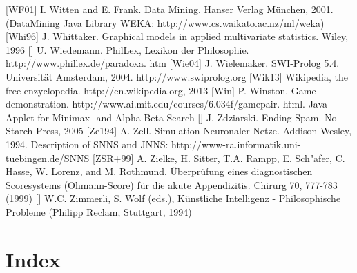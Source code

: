 \documentclass[10pt]{book}
\begin{document}
[WF01] I. Witten and E. Frank. Data Mining. Hanser Verlag München, 2001. (DataMining Java Library WEKA: http://www.cs.waikato.ac.nz/ml/weka)
[Whi96] J. Whittaker. Graphical models in applied multivariate statistics. Wiley, 1996
[\cite{wiedemannphillex}] U. Wiedemann. PhilLex, Lexikon der Philosophie. http://www.phillex.de/paradoxa. htm
[Wie04] J. Wielemaker. SWI-Prolog 5.4. Universität Amsterdam, 2004. http://www.swiprolog.org
[Wik13] Wikipedia, the free enzyclopedia. http://en.wikipedia.org, 2013
[Win] P. Winston. Game demonstration. http://www.ai.mit.edu/courses/6.034f/gamepair. html. Java Applet for Minimax- and Alpha-Beta-Search
[\cite{zdziarski2005endingspam}] J. Zdziarski. Ending Spam. No Starch Press, 2005
[Ze194] A. Zell. Simulation Neuronaler Netze. Addison Wesley, 1994. Description of SNNS and JNNS: http://www-ra.informatik.uni-tuebingen.de/SNNS
[ZSR+99] A. Zielke, H. Sitter, T.A. Rampp, E. Sch"afer, C. Hasse, W. Lorenz, and M. Rothmund. Überprüfung eines diagnostischen Scoresystems (Ohmann-Score) für die akute Appendizitis. Chirurg 70, 777-783 (1999)
[\cite{zimmerli1994ki}] W.C. Zimmerli, S. Wolf (eds.), Künstliche Intelligenz - Philosophische Probleme (Philipp Reclam, Stuttgart, 1994)
\clearpage
\chapter{Index}
\end{document}
